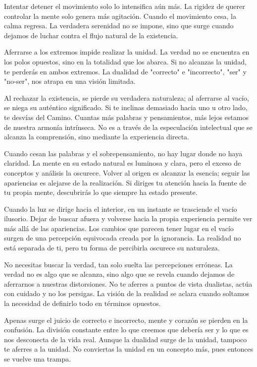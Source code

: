 \documentclass[
  a5paperpaper,
]{article}
\begin{document}
Intentar detener el movimiento solo lo intensifica aún más. La rigidez
de querer controlar la mente solo genera más agitación. Cuando el
movimiento cesa, la calma regresa. La verdadera serenidad no se impone,
sino que surge cuando dejamos de luchar contra el flujo natural de la
existencia.

Aferrarse a los extremos impide realizar la unidad. La verdad no se
encuentra en los polos opuestos, sino en la totalidad que los abarca. Si
no alcanzas la unidad, te perderás en ambos extremos. La dualidad de
"correcto" e "incorrecto", "ser" y "no-ser", nos atrapa en una visión
limitada.

Al rechazar la existencia, se pierde su verdadera naturaleza; al
aferrarse al vacío, se niega su auténtico significado. Si te inclinas
demasiado hacia uno u otro lado, te desvías del Camino. Cuantas más
palabras y pensamientos, más lejos estamos de nuestra armonía
intrínseca. No es a través de la especulación intelectual que se alcanza
la comprensión, sino mediante la experiencia directa.

Cuando cesan las palabras y el sobrepensamiento, no hay lugar donde no
haya claridad. La mente en su estado natural es luminosa y clara, pero
el exceso de conceptos y análisis la oscurece. Volver al origen es
alcanzar la esencia; seguir las apariencias es alejarse de la
realización. Si diriges tu atención hacia la fuente de tu propia mente,
descubrirás lo que siempre ha estado presente.

Cuando la luz se dirige hacia el interior, en un instante se trasciende
el vacío ilusorio. Dejar de buscar afuera y volverse hacia la propia
experiencia permite ver más allá de las apariencias. Los cambios que
parecen tener lugar en el vacío surgen de una percepción equivocada
creada por la ignorancia. La realidad no está separada de ti, pero tu
forma de percibirla oscurece su naturaleza.

No necesitas buscar la verdad, tan solo suelta las percepciones
erróneas. La verdad no es algo que se alcanza, sino algo que se revela
cuando dejamos de aferrarnos a nuestras distorsiones. No te aferres a
puntos de vista dualistas, actúa con cuidado y no los persigas. La
visión de la realidad se aclara cuando soltamos la necesidad de
definirlo todo en términos opuestos.

Apenas surge el juicio de correcto e incorrecto, mente y corazón se
pierden en la confusión. La división constante entre lo que creemos que
debería ser y lo que es nos desconecta de la vida real. Aunque la
dualidad surge de la unidad, tampoco te aferres a la unidad. No
conviertas la unidad en un concepto más, pues entonces se vuelve una
trampa.
\end{document}

